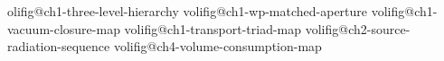 


\expandafter\newcommand\csname volifig@ch1-three-level-hierarchy\endcsname{%
  \VolIPhysFig{\VolIPhysThreeLevelHierarchy}}
\expandafter\newcommand\csname volifig@ch1-wp-matched-aperture\endcsname{%
  \VolIPhysFig{\VolIPhysMatchedAperture}}
\expandafter\newcommand\csname volifig@ch1-vacuum-closure-map\endcsname{%
  \VolIPhysFig{\VolIPhysVacuumClosureMap}}
\expandafter\newcommand\csname volifig@ch1-transport-triad-map\endcsname{%
  \VolIPhysFig{\VolIPhysChapterOneSynthesis}}
\expandafter\newcommand\csname volifig@ch2-source-radiation-sequence\endcsname{%
  \VolIPhysFig{\VolIPhysSourceRadiationSequence}}
\expandafter\newcommand\csname volifig@ch4-volume-consumption-map\endcsname{%
  \VolIPhysFig{\VolIPhysMaxwellBoundaryVolume}}

\makeatletter
\newcommand{\VolIFigInclude}[1]{%
  \ifcsname volifig@#1\endcsname
    \@nameuse{volifig@#1}%
  \else
    \PackageWarning{fig-macros}{Unknown VolIFigInclude slug `#1'}%
  \fi
}
\makeatother